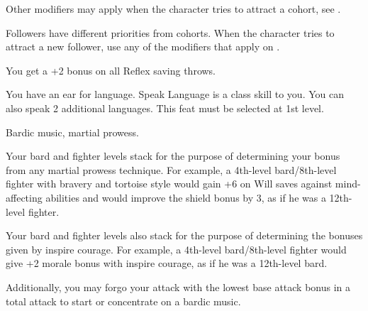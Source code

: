 {

Other modifiers may apply when the character tries to attract a cohort, see .


Followers have different priorities from cohorts. When the character tries to attract a new follower, use any of the modifiers that apply on .

}

{You get a +2 bonus on all Reflex saving throws.}

{You have an ear for language.}{}
{Speak Language is a class skill to you. You can also speak 2 additional languages.}{}
{This feat must be selected at 1st level.}

{Bardic music, martial prowess.}
{
Your bard and fighter levels stack for the purpose of determining your bonus from any martial prowess technique. For example, a 4th-level bard/8th-level fighter with bravery and tortoise style would gain +6 on Will saves against mind-affecting abilities and would improve the shield bonus by 3, as if he was a 12th-level fighter.

Your bard and fighter levels also stack for the purpose of determining the bonuses given by inspire courage. For example, a 4th-level bard/8th-level fighter would give +2 morale bonus with inspire courage, as if he was a 12th-level bard.

Additionally, you may forgo your attack with the lowest base attack bonus in a total attack to start or concentrate on a bardic music.
}

